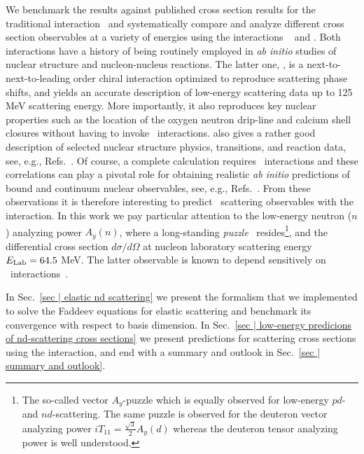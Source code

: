 \documentclass[aps,prc,showpacs,twocolumn,floatfix,nobibnotes,nofootinbib,amsmath,amssymb,longbibliography]{revtex4-2}
\begin{document}
We benchmark the \wpcd{} results against published cross section
results for the traditional \NijmI{} \NN{}
interaction~\cite{Stoks:1994wp} and systematically compare and analyze
different cross section observables at a variety of energies using the
interactions \INNNLO{}~\cite{Entem:2003ft} and \NNLOopt. Both
interactions have a history of being routinely employed in \textit{ab
  initio} studies of nuclear structure and nucleon-nucleus
reactions. The latter one, \NNLOopt{}, is a next-to-next-to-leading
order chiral interaction optimized to reproduce \NN{} scattering phase
shifts, and yields an accurate description of low-energy \NN{}
scattering data up to 125 MeV scattering energy. More importantly, it
also reproduces key nuclear properties such as the location of the
oxygen neutron drip-line and calcium shell closures without having to
invoke \NNN~interactions. \NNLOopt{} also gives a rather good
description of selected nuclear structure physics, transitions, and
reaction data, see, e.g.,
Refs.~\cite{Dytrych:2018vkl,Burrows:2018ggt,Rotureau:2018pxk}. Of
course, a complete calculation requires \NNN~interactions and these
correlations can play a pivotal role for obtaining realistic
\textit{ab initio} predictions of bound and continuum nuclear
observables, see, e.g.,
Refs.~\cite{Witala:2000am,Pieper:2001mp,Epelbaum:2002vt,Navratil:2007we,Otsuka:2009cs,Kalantar-Nayestanaki:2011rzs,Calci:2016dfb,Hebeler:2020ocj}. From
these observations it is therefore interesting to predict
\Nd~scattering observables with the \NNLOopt{} interaction. In this
work we pay particular attention to the low-energy neutron ($n$)
analyzing power $A_y(n)$, where a long-standing
\textit{puzzle}~\cite{Huber:1998hu} resides\footnote{The so-called
  \Nd{} vector $A_y$-puzzle which is equally observed for low-energy
  $pd$- and $nd$-scattering. The same puzzle is observed for the
  deuteron vector analyzing power $iT_{11} = \frac{\sqrt{3}}{2}A_y(d)$
  whereas the deuteron tensor analyzing power is well understood.},
and the \nd{} differential cross section $d\sigma/d\Omega$ at nucleon
laboratory scattering energy $E_\text{Lab} = 64.5$ MeV. The latter observable
is known to depend sensitively on
\NNN~interactions~\cite{Witala:1998ey, LENPIC:2018ewt}.

In Sec.~\ref{sec | elastic nd scattering} we present the formalism
that we implemented to solve the Faddeev equations for elastic \Nd{}
scattering and benchmark its convergence with respect to basis
dimension. In Sec.~\ref{sec | low-energy predicions of nd-scattering
  cross sections} we present predictions for \nd{} scattering cross
sections using the \NNLOopt{} interaction, and end with a summary and
outlook in Sec.~\ref{sec | summary and outlook}.
\end{document}
